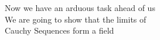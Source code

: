 \documentclass[preview]{standalone}
\begin{document}
\begin{center}
Now we have an arduous task ahead of us\\We are going to show that the limits of\\Cauchy Sequences form a field
\end{center}
\end{document}
